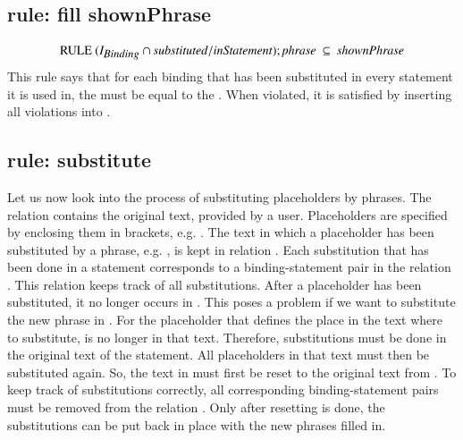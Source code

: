 \documentclass{elsarticle}
\begin{document}
\subsection{rule: fill shownPhrase}
\label{rule: fill shownPhrase}

\[\text{RULE}\ (\ident{Binding}\cap\id{substituted}/\id{inStatement} );\id{phrase}\ \subs\ \id{shownPhrase} \]
        This rule says that for each binding that has been substituted in every statement it is used in,
	the  must be equal to the .
	When violated, it is satisfied by inserting all violations into .

\subsection{rule: substitute}
\label{rule: substitute}
	Let us now look into the process of substituting placeholders by phrases.
	The relation  contains the original text, provided by a user.
	Placeholders are specified by enclosing them in brackets,
	e.g. .
	The text in which a placeholder has been substituted by a phrase,
	e.g. ,
	is kept in relation .
	Each substitution that has been done in a statement corresponds to a binding-statement pair in the relation .
	This relation keeps track of all substitutions.
	After a placeholder has been substituted, it no longer occurs in .
	This poses a problem if we want to substitute the new phrase in .
    For the placeholder that defines the place in the text where to substitute, is no longer in that text.
	Therefore, substitutions must be done in the original text of the statement.
	All placeholders in that text must then be substituted again.
	So, the text in  must first be reset to the original text from .
	To keep track of substitutions correctly, all corresponding binding-statement pairs must be removed from the relation .
	Only after resetting is done, the substitutions can be put back in place with the new phrases filled in.
	
\end{document}
